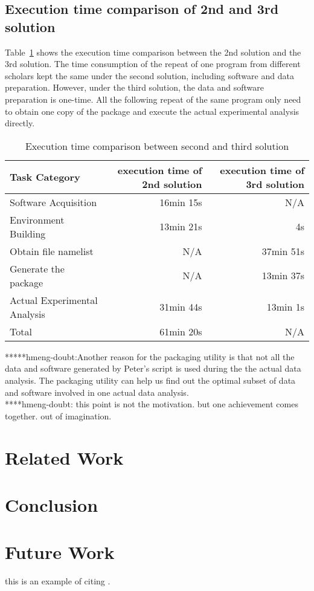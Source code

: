 \documentclass{article}
\begin{document}
\subsection{Execution time comparison of 2nd and 3rd solution}
\indent Table~\ref{table:time-2nd3rd} shows the execution time comparison between the 2nd solution and the 3rd solution. The time consumption of the repeat of one program from different scholars kept the same under the second solution, including software and data preparation. However, under the third solution, the data and software preparation is one-time. All the following repeat of the same program only need to obtain one copy of the package and execute the actual experimental analysis directly.

\begin{table}
    \centering
    \begin{tabular}{|l|r|r|}
    \hline
    Task Category & execution time of 2nd solution & execution time of 3rd solution \\ \hline
    Software Acquisition & 16min 15s & N/A \\ \hline
    Environment Building & 13min 21s  & 4s \\ \hline
    Obtain file namelist & N/A & 37min 51s \\ \hline
    Generate the package & N/A & 13min 37s \\ \hline
    Actual Experimental Analysis & 31min 44s & 13min 1s \\ \hline
    Total & 61min 20s & N/A \\ \hline
    \end{tabular}
    \caption{Execution time comparison between second and third solution}
    \label{table:time-2nd3rd}
\end{table}    

*****hmeng-doubt:Another reason for the packaging utility is that not all the data and software generated by Peter’s script is used during the the actual data analysis. The packaging utility can help us find out the optimal subset of data and software involved in one actual data analysis. \\
\indent *****hmeng-doubt: this point is not the motivation. but one achievement comes together. out of imagination.\\

\section{Related Work }

\section{Conclusion}

\section{Future Work}
\indent this is an example of citing \cite{Laboratories79make}. \\



\end{document}
